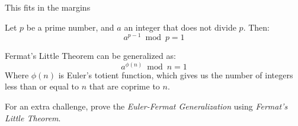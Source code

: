 \begin{namedframe}{This fits in the margins}
	\begin{theorem}
		Let $p$ be a prime number, and $a$ an integer that does not divide $p$.
		\vertspace
		Then:
		\[a^{p-1} \bmod p = 1\]
	\end{theorem}
	\pause
	\begin{theorem}
		Fermat's Little Theorem can be generalized as:
		\[a^{\phi(n)} \bmod n = 1\]
		Where $\phi(n)$ is Euler's totient function, which gives us the number of integers less than or equal to $n$ that are coprime to $n$.

	\end{theorem}
	\pause
	For an extra challenge, prove the \emph{Euler-Fermat Generalization} using \emph{Fermat's Little Theorem}.
\end{namedframe}
